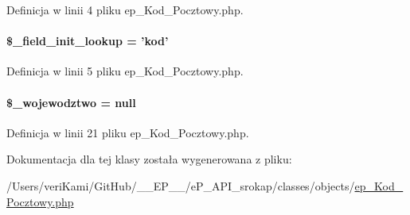 Definicja w linii 4 pliku ep\-\_\-\-Kod\-\_\-\-Pocztowy.\-php.

\hypertarget{classep___kod___pocztowy_a4a4d54ae35428077a7c61ec8a5139af3}{
\paragraph[{\$\-\_\-field\-\_\-init\-\_\-lookup}]{\setlength{\rightskip}{0pt plus 5cm}\$\-\_\-field\-\_\-init\-\_\-lookup = 'kod'}}\label{classep___kod___pocztowy_a4a4d54ae35428077a7c61ec8a5139af3}


Definicja w linii 5 pliku ep\-\_\-\-Kod\-\_\-\-Pocztowy.\-php.

\hypertarget{classep___kod___pocztowy_a2a0a830e555a9e31b5118be82dbc33c7}{
\paragraph[{\$\-\_\-wojewodztwo}]{\setlength{\rightskip}{0pt plus 5cm}\$\-\_\-wojewodztwo = null\hspace{0.3cm}{\ttfamily [protected]}}}\label{classep___kod___pocztowy_a2a0a830e555a9e31b5118be82dbc33c7}


Definicja w linii 21 pliku ep\-\_\-\-Kod\-\_\-\-Pocztowy.\-php.



Dokumentacja dla tej klasy została wygenerowana z pliku\-:\begin{DoxyCompactItemize}
\item 
/\-Users/veri\-Kami/\-Git\-Hub/\-\_\-\-\_\-\-E\-P\-\_\-\-\_\-/e\-P\-\_\-\-A\-P\-I\-\_\-srokap/classes/objects/\hyperlink{ep___kod___pocztowy_8php}{ep\-\_\-\-Kod\-\_\-\-Pocztowy.\-php}\end{DoxyCompactItemize}

